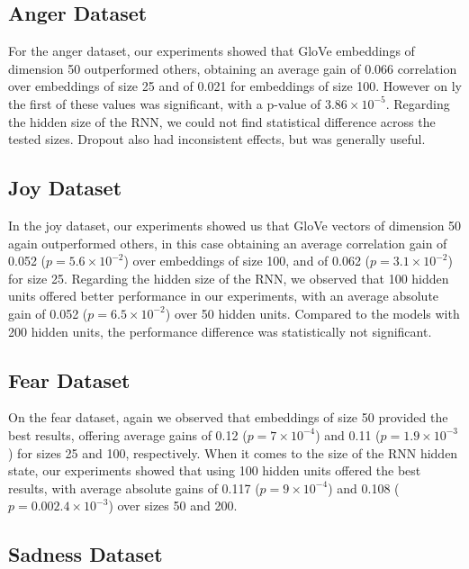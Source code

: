 \documentclass[11pt,letterpaper]{article}
\begin{document}
\subsection{Anger Dataset}

For the anger dataset, our experiments showed that GloVe embeddings of dimension 50 outperformed others, obtaining an average gain of 0.066 correlation over embeddings of size 25 and of 0.021 for embeddings of size 100. However on ly the first of these values was significant, with a p-value of $3.86 \times 10^{-5}$. Regarding the hidden size of the RNN, we could not find statistical difference across the tested sizes. Dropout also had inconsistent effects, but was generally useful. 


\subsection{Joy Dataset}

In the joy dataset, our experiments showed us that  GloVe vectors of dimension 50 again outperformed others, in this case obtaining an average correlation gain of 0.052 ($p = 5.6 \times 10^{-2}$) over embeddings of size 100, and of 0.062 ($p = 3.1 \times 10^{-2}$) for size 25. Regarding the hidden size of the RNN, we observed that 100 hidden units offered better performance in our experiments, with an average absolute gain of 0.052 ($p = 6.5 \times 10^{-2}$) over 50 hidden units. Compared to the models with 200 hidden units, the performance difference was statistically not significant.



\subsection{Fear Dataset}

On the fear dataset, again we observed that embeddings of size 50 provided the best results, offering average gains of 0.12 ($p = 7 \times 10^{-4}$) and 0.11 ($p = 1.9 \times 10^{-3}$) for sizes 25 and 100, respectively. When it comes to the size of the RNN hidden state, our experiments showed that using 100 hidden units offered the best results, with average absolute gains of 0.117 ($p = 9 \times 10^{-4}$) and 0.108 ($p = 0.002.4 \times 10^{-3}$) over sizes 50 and 200.

\subsection{Sadness Dataset}
\end{document}
